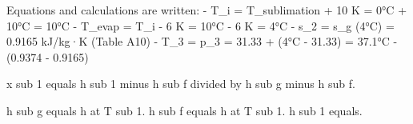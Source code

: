 Equations and calculations are written:  
- T_i = T_sublimation + 10 K = 0°C + 10°C = 10°C  
- T_evap = T_i - 6 K = 10°C - 6 K = 4°C  
- s_2 = s_g (4°C) = 0.9165 kJ/kg·K (Table A10)  
- T_3 = p_3 = 31.33 + (4°C - 31.33) = 37.1°C  
- (0.9374 - 0.9165)

x sub 1 equals h sub 1 minus h sub f divided by h sub g minus h sub f.  

h sub g equals h at T sub 1.  
h sub f equals h at T sub 1.  
h sub 1 equals.